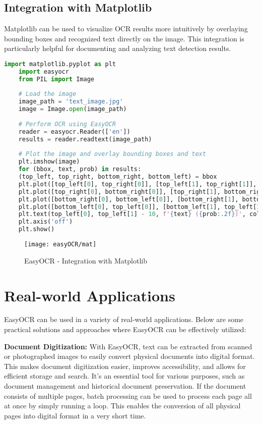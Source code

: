 \subsection{Integration with Matplotlib}
Matplotlib can be used to visualize OCR results more intuitively by overlaying bounding boxes and recognized text directly on the image. This integration is particularly helpful for documenting and analyzing text detection results.\cite{Izah:2023} 

\begin{lstlisting}[language=Python, caption=Text Detection and Visualization with EasyOCR and Matplotlib]
	import matplotlib.pyplot as plt
	import easyocr
	from PIL import Image
	
	# Load the image
	image_path = 'text_image.jpg'
	image = Image.open(image_path)
	
	# Perform OCR using EasyOCR
	reader = easyocr.Reader(['en'])
	results = reader.readtext(image_path)
	
	# Plot the image and overlay bounding boxes and text
	plt.imshow(image)
	for (bbox, text, prob) in results:
	(top_left, top_right, bottom_right, bottom_left) = bbox
	plt.plot([top_left[0], top_right[0]], [top_left[1], top_right[1]], 'r-')
	plt.plot([top_right[0], bottom_right[0]], [top_right[1], bottom_right[1]], 'r-')
	plt.plot([bottom_right[0], bottom_left[0]], [bottom_right[1], bottom_left[1]], 'r-')
	plt.plot([bottom_left[0], top_left[0]], [bottom_left[1], top_left[1]], 'r-')
	plt.text(top_left[0], top_left[1] - 10, f'{text} ({prob:.2f})', color='green', fontsize=12)
	plt.axis('off')
	plt.show()
\end{lstlisting}

\begin{figure}[h]
	\centering
	\texttt{[image: easyOCR/mat]}
	\caption{EasyOCR - Integration with Matplotlib}\label{Integration with Matplotlib}
\end{figure}

\section{Real-world Applications}

EasyOCR can be used in a variety of real-world applications. Below are some practical solutions and approaches where EasyOCR can be effectively utilized:

\textbf{Document Digitization:} With EasyOCR, text can be extracted from scanned or photographed images to easily convert physical documents into digital format. This makes document digitization easier, improves accessibility, and allows for efficient storage and search. It’s an essential tool for various purposes, such as document management and historical document preservation. If the document consists of multiple pages, batch processing can be used to process each page all at once by simply running a loop. This enables the conversion of all physical pages into digital format in a very short time. \cite{Mahajan:2023} 

